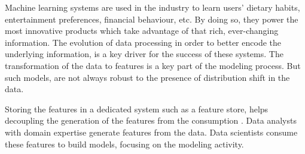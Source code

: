 \documentclass[12pt]{report}
\begin{document}

Machine learning systems are used in the industry to learn users' dietary habits, entertainment preferences, financial behaviour, etc.
By doing so, they power the most innovative products which take advantage of that rich, ever-changing information.
The evolution of data processing in order to better encode the underlying information, is a key driver for the success of these systems.
The transformation of the data to features is a key part of the modeling process.
But such models, are not always robust to the presence of distribution shift in the data.

Storing the features in a dedicated system such as a feature store, helps decoupling the generation of the features from the consumption \cite{MachineLearningDesign}.
Data analysts with domain expertise generate features from the data.
Data scientists consume these features to build models, focusing on the modeling activity.
\end{document}
